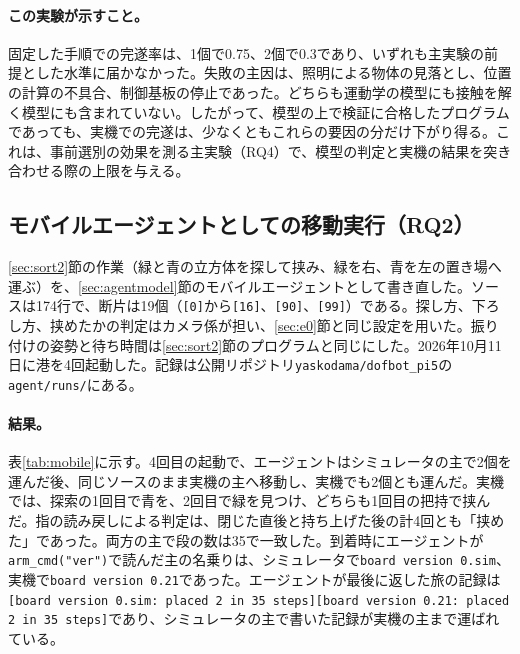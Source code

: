 \documentclass[10pt,letterpaper]{article}
\begin{document}
\paragraph{この実験が示すこと。}固定した手順での完遂率は、1個で0.75、2個で0.3であり、いずれも主実験の前提とした水準に届かなかった。失敗の主因は、照明による物体の見落とし、位置の計算の不具合、制御基板の停止であった。どちらも運動学の模型にも接触を解く模型にも含まれていない。したがって、模型の上で検証に合格したプログラムであっても、実機での完遂は、少なくともこれらの要因の分だけ下がり得る。これは、事前選別の効果を測る主実験（RQ4）で、模型の判定と実機の結果を突き合わせる際の上限を与える。

\subsection{モバイルエージェントとしての移動実行（RQ2）}\label{sec:mobile}
\ref{sec:sort2}節の作業（緑と青の立方体を探して挟み、緑を右、青を左の置き場へ運ぶ）を、\ref{sec:agentmodel}節のモバイルエージェントとして書き直した。ソースは174行で、断片は19個（\texttt{[0]}から\texttt{[16]}、\texttt{[90]}、\texttt{[99]}）である。探し方、下ろし方、挟めたかの判定はカメラ係が担い、\ref{sec:e0}節と同じ設定を用いた。振り付けの姿勢と待ち時間は\ref{sec:sort2}節のプログラムと同じにした。2026年10月11日に港を4回起動した。記録は公開リポジトリ\texttt{yaskodama/dofbot\_pi5}の\texttt{agent/runs/}にある。

\paragraph{結果。}表\ref{tab:mobile}に示す。4回目の起動で、エージェントはシミュレータの主で2個を運んだ後、同じソースのまま実機の主へ移動し、実機でも2個とも運んだ。実機では、探索の1回目で青を、2回目で緑を見つけ、どちらも1回目の把持で挟んだ。指の読み戻しによる判定は、閉じた直後と持ち上げた後の計4回とも「挟めた」であった。両方の主で段の数は35で一致した。到着時にエージェントが\texttt{arm\_cmd("ver")}で読んだ主の名乗りは、シミュレータで\texttt{board version 0.sim}、実機で\texttt{board version 0.21}であった。エージェントが最後に返した旅の記録は\texttt{[board version 0.sim: placed 2 in 35 steps][board version 0.21: placed 2 in 35 steps]}であり、シミュレータの主で書いた記録が実機の主まで運ばれている。
\end{document}
